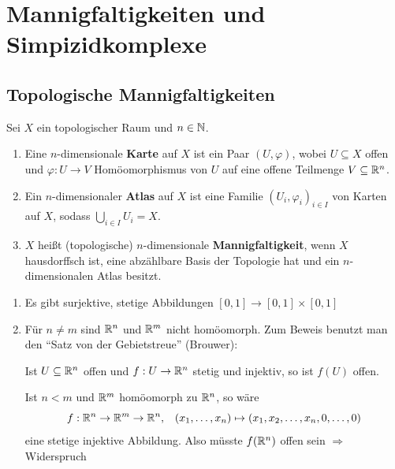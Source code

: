 \chapter{Mannigfaltigkeiten und Simpizidkomplexe}
\section{Topologische Mannigfaltigkeiten}
\begin{definition}
    Sei $X$ ein topologischer Raum und $n \in \mathbb{N}$.
    \begin{enumerate}[label=(\alph*)]
        \item Eine $n$-dimensionale \textbf{Karte} auf
              $X$ ist ein Paar $(U, \varphi)$, wobei $U \subseteq X$
              offen und $\varphi: U \rightarrow V$ Homöomorphismus
              von $U$ auf eine offene Teilmenge $V \subseteq \mathbb{R}^n$.
        \item Ein $n$-dimensionaler \textbf{Atlas} auf $X$ ist eine
              Familie $(U_i, \varphi_i)_{i \in I}$ von Karten auf $X$,
              sodass $\bigcup_{i \in I} U_i = X$.
        \item $X$ heißt (topologische) $n$-dimensionale \textbf{Mannigfaltigkeit},
              wenn $X$ hausdorffsch ist, eine abzählbare Basis der 
              Topologie hat und ein $n$-dimensionalen Atlas besitzt.
    \end{enumerate}
\end{definition}

\begin{bemerkung}
    \begin{enumerate}[label=(\alph*)]
        \item Es gibt surjektive, stetige Abbildungen $[0,1] \rightarrow [0,1] \times [0,1]$
        \item Für $n \neq m$ sind $\mathbb{R}^n$ und $\mathbb{R}^m$ nicht homöomorph.
              Zum Beweis benutzt man den \enquote{Satz von der Gebietstreue} (Brouwer):

              Ist $U \subseteq \mathbb{R}^n$ offen und $f: U \rightarrow \mathbb{R}^n$
              stetig und injektiv, so ist $f(U)$ offen.

              Ist $n < m$ und $\mathbb{R}^m$ homöomorph zu $\mathbb{R}^n$, so wäre
              \[f:\mathbb{R}^n \rightarrow \mathbb{R}^m \rightarrow \mathbb{R}^n, \;\;\; (x_1, \dots, x_n) \mapsto (x_1, x_2, \dots, x_n, 0, \dots, 0)\]
              eine stetige injektive Abbildung. Also müsste $f(\mathbb{R}^n)$
              offen sein $\Rightarrow$ Widerspruch
    \end{enumerate}
\end{bemerkung}

